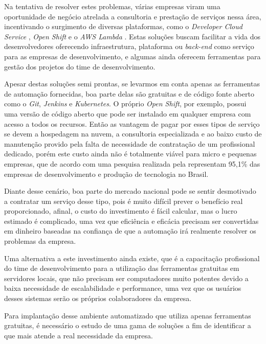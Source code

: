 \documentclass[
12pt,				%
openright,			%
oneside,			%
a4paper,			%
english,			%
french,				%
spanish,			%
brazil,				%
]{abntex2}
\begin{document}
Na tentativa de resolver estes problemas, várias empresas viram uma oportunidade de negócio atrelada a consultoria e prestação de serviços nessa área, incentivando o surgimento de diversas plataformas, como o \textit{Developer Cloud Service} \cite{Oracle:DevOps}, \textit{Open Shift} \cite{RedHat:OpenShift} e o \textit{AWS Lambda} \cite{Amazon:Lambda}. Estas soluções buscam facilitar a vida dos desenvolvedores oferecendo infraestrutura, plataforma ou \textit{back-end} como serviço para as empresas de desenvolvimento, e algumas ainda oferecem ferramentas para gestão dos projetos do time de desenvolvimento.

Apesar destas soluções semi prontas, se levarmos em conta apenas as ferramentas de automação fornecidas, boa parte delas são gratuitas e de código fonte aberto como o \textit{Git}, \textit{Jenkins} e \textit{Kubernetes}. O próprio \textit{Open Shift}, por exemplo, possui uma versão de código aberto que pode ser instalado em qualquer empresa com acesso a todos os recursos. Então as vantagem de pagar por esses tipos de serviço se devem a hospedagem na nuvem, a consultoria especializada e ao baixo custo de manutenção provido pela falta de necessidade de contratação de um profissional dedicado, porém este custo ainda não é totalmente viável para micro e pequenas empresas, que de acordo com uma pesquisa realizada pela  representam 95,1\% das empresas de desenvolvimento e produção de tecnologia no Brasil.

Diante desse cenário, boa parte do mercado nacional pode se sentir desmotivado a contratar um serviço desse tipo, pois é muito difícil prever o benefício real proporcionado, afinal, o custo do investimento é fácil calcular, mas o lucro estimado é complicado, uma vez que eficiência e eficácia precisam ser convertidas em dinheiro baseadas na confiança de que a automação irá realmente resolver os problemas da empresa.

Uma alternativa a este investimento ainda existe, que é a capacitação profissional do time de desenvolvimento para a utilização das ferramentas gratuitas em servidores locais, que não precisam ser computadores muito potentes devido a baixa necessidade de escalabilidade e performance, uma vez que os usuários desses sistemas serão os próprios colaboradores da empresa.

Para implantação desse ambiente automatizado que utiliza apenas ferramentas gratuitas, é necessário o estudo de uma gama de soluções a fim de identificar a que mais atende a real necessidade da empresa.
\end{document}
